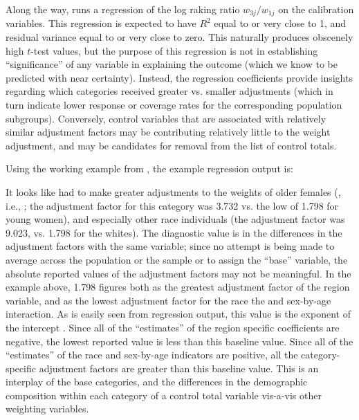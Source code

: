 Along the way,  runs a regression of the log raking ratio $w_{3j}/w_{1j}$
on the calibration variables. This regression is expected to have $R^2$ equal to or very close to 1,
and residual variance equal to or very close to zero. This naturally produces obscenely
high $t$-test values, but the purpose of this regression is not in establishing
``significance'' of any variable in explaining the outcome (which we know to be predicted
with near certainty).
Instead, the regression coefficients provide insights regarding which categories received
greater vs. smaller adjustments (which in turn indicate lower response or coverage rates
for the corresponding population subgroups). Conversely, control variables that are
associated with relatively similar adjustment factors may be contributing relatively
little to the weight adjustment, and may be candidates for removal from the list of control totals.

Using the working example from \citet{kolenikov:2014}, the example regression output is:

\begin{stlog}


\nullskip
\end{stlog}

It looks like  had to make greater adjustments to the weights
of older females (, i.e., ;
the adjustment factor for this category was 3.732 vs. the low of 1.798 for young women),
and especially other race individuals (the adjustment factor was 9.023,
vs. 1.798 for the whites). The diagnostic value is in the differences in the adjustment
factors with the same variable; since no attempt is being made to average
across the population or the sample or to assign the ``base'' variable,
the absolute reported values of the adjustment factors may not be
meaningful. In the example above, 1.798 figures both as the greatest adjustment
factor of the region variable, and as the lowest adjustment factor
for the race the and sex-by-age interaction. As is easily seen from regression
output, this value is the exponent of the intercept .
Since all of the ``estimates'' of the region specific coefficients are negative,
the lowest reported value is less than this baseline value. Since all of the
``estimates'' of the race and sex-by-age indicators are positive, all
the category-specific adjustment factors are greater than this baseline value.
This is an interplay of the base categories, and the differences in the
demographic composition within each category of a control total variable
vis-a-vis other weighting variables.

